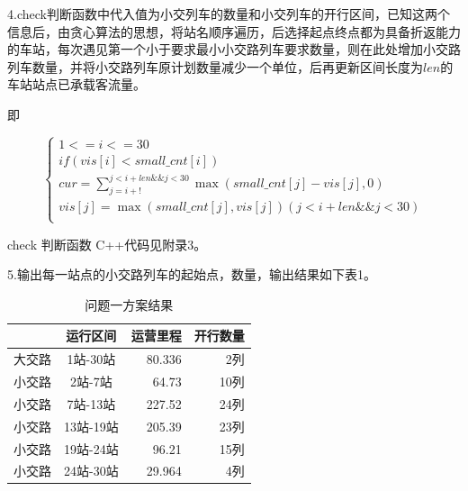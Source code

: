 \documentclass[UTF8]{ctexart}
\begin{document}
4.check判断函数中代入值为小交列车的数量和小交列车的开行区间，已知这两个信息后，由贪心算法的思想，将站名顺序遍历，后选择起点终点都为具备折返能力的车站，每次遇见第一个小于要求最小小交路列车要求数量，则在此处增加小交路列车数量，并将小交路列车原计划数量减少一个单位，后再更新区间长度为$len$的车站站点已承载客流量。\par
即\par
$$
\left\{ \begin{array}{c}
	1<=i<=30\\
	if\left( vis\left[ i \right] <small\_cnt\left[ i \right] \right) \\
	cur=\sum_{j=i+!}^{j<i+len\&\&j<30}{\max \left( small\_cnt\left[ j \right] -vis\left[ j \right] ,0 \right)}\\
	vis\left[ j \right] =\max \left( small\_cnt\left[ j \right] ,vis\left[ j \right] \right) \left( j<i+len\&\&j<30 \right)\\
\end{array} \right. 
$$\par
check 判断函数 C++代码见附录3。\par
5.输出每一站点的小交路列车的起始点，数量，输出结果如下表1。\par

\begin{table}[h!]
	\begin{center}
		\caption{问题一方案结果}
		\begin{tabular}{l|c|r|r} 
			  & \textbf{运行区间} & \textbf{运营里程} & \textbf{开行数量}\\
			\hline
			大交路 & 1站-30站 & 80.336 & 2列 \\
			小交路 & 2站-7站 & 64.73 & 10列 \\
			小交路 & 7站-13站 & 227.52 & 24列\\
			小交路 & 13站-19站 & 205.39 & 23列 \\
			小交路 & 19站-24站 & 96.21  & 15列 \\ 
			小交路 & 24站-30站 & 29.964 & 4列 \\
			
		\end{tabular}
	\end{center}
\end{table}
\end{document}
